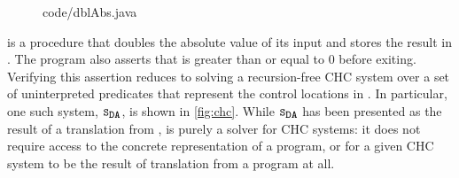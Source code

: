 \begin{figure}[t]
  \centering
  \begin{floatrow}[2]
    {
      
        {code/dblAbs.java}
    }
  \end{floatrow}
\end{figure}
%
 is a procedure that doubles the absolute value of
its input and stores the result in .
The program also asserts that  is greater than or equal to $0$
before exiting.
Verifying this assertion reduces to solving a recursion-free
CHC system over a set of uninterpreted predicates that represent
the control locations in .
%
In particular, one such system, $\mcchc$, is shown in
\autoref{fig:chc}.
%
%
While $\mcchc$ has been presented as the result
of a translation from , \sys is
purely a solver for CHC systems: it does not require access to the
concrete representation of a program, or for a given CHC system to be
the result of translation from a program at all.


